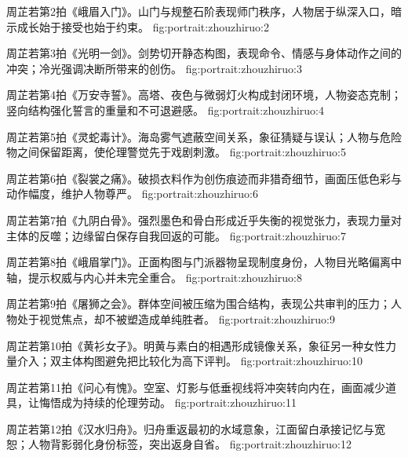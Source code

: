   {周芷若第2拍《峨眉入门》。山门与规整石阶表现师门秩序，人物居于纵深入口，暗示成长始于接受也始于约束。}
  {fig:portrait:zhouzhiruo:2}

  {周芷若第3拍《光明一剑》。剑势切开静态构图，表现命令、情感与身体动作之间的冲突；冷光强调决断所带来的创伤。}
  {fig:portrait:zhouzhiruo:3}

\clearpage

  {周芷若第4拍《万安寺誓》。高塔、夜色与微弱灯火构成封闭环境，人物姿态克制；竖向结构强化誓言的重量和不可退避感。}
  {fig:portrait:zhouzhiruo:4}

  {周芷若第5拍《灵蛇毒计》。海岛雾气遮蔽空间关系，象征猜疑与误认；人物与危险物之间保留距离，使伦理警觉先于戏剧刺激。}
  {fig:portrait:zhouzhiruo:5}

  {周芷若第6拍《裂裳之痛》。破损衣料作为创伤痕迹而非猎奇细节，画面压低色彩与动作幅度，维护人物尊严。}
  {fig:portrait:zhouzhiruo:6}

\clearpage

  {周芷若第7拍《九阴白骨》。强烈墨色和骨白形成近乎失衡的视觉张力，表现力量对主体的反噬；边缘留白保存自我回返的可能。}
  {fig:portrait:zhouzhiruo:7}

  {周芷若第8拍《峨眉掌门》。正面构图与门派器物呈现制度身份，人物目光略偏离中轴，提示权威与内心并未完全重合。}
  {fig:portrait:zhouzhiruo:8}

  {周芷若第9拍《屠狮之会》。群体空间被压缩为围合结构，表现公共审判的压力；人物处于视觉焦点，却不被塑造成单纯胜者。}
  {fig:portrait:zhouzhiruo:9}

\clearpage

  {周芷若第10拍《黄衫女子》。明黄与素白的相遇形成镜像关系，象征另一种女性力量介入；双主体构图避免把比较化为高下评判。}
  {fig:portrait:zhouzhiruo:10}

  {周芷若第11拍《问心有愧》。空室、灯影与低垂视线将冲突转向内在，画面减少道具，让悔悟成为持续的伦理劳动。}
  {fig:portrait:zhouzhiruo:11}

  {周芷若第12拍《汉水归舟》。归舟重返最初的水域意象，江面留白承接记忆与宽恕；人物背影弱化身份标签，突出返身自省。}
  {fig:portrait:zhouzhiruo:12}


